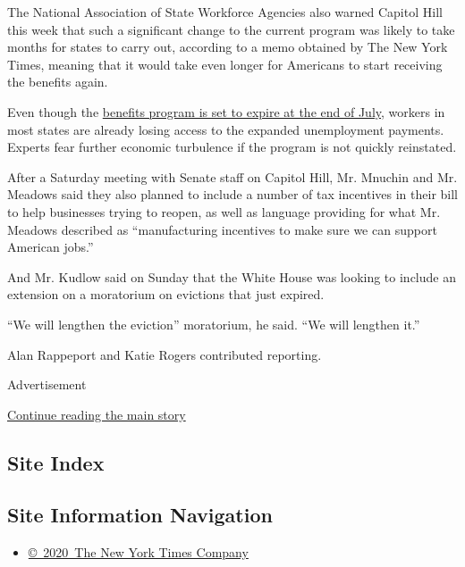 The National Association of State Workforce Agencies also warned Capitol
Hill this week that such a significant change to the current program was
likely to take months for states to carry out, according to a memo
obtained by The New York Times, meaning that it would take even longer
for Americans to start receiving the benefits again.

Even though the
\href{https://www.nytimes.com/2020/07/21/business/economy/coronavirus-unemployment-benefits.html}{benefits
program is set to expire at the end of July}, workers in most states are
already losing access to the expanded unemployment payments. Experts
fear further economic turbulence if the program is not quickly
reinstated.

After a Saturday meeting with Senate staff on Capitol Hill, Mr. Mnuchin
and Mr. Meadows said they also planned to include a number of tax
incentives in their bill to help businesses trying to reopen, as well as
language providing for what Mr. Meadows described as ``manufacturing
incentives to make sure we can support American jobs.''

And Mr. Kudlow said on Sunday that the White House was looking to
include an extension on a moratorium on evictions that just expired.

``We will lengthen the eviction'' moratorium, he said. ``We will
lengthen it.''

Alan Rappeport and Katie Rogers contributed reporting.

Advertisement

\protect\hyperlink{after-bottom}{Continue reading the main story}

\hypertarget{site-index}{%
\subsection{Site Index}\label{site-index}}

\hypertarget{site-information-navigation}{%
\subsection{Site Information
Navigation}\label{site-information-navigation}}

\begin{itemize}
\tightlist
\item
  \href{https://help.nytimes.com/hc/en-us/articles/115014792127-Copyright-notice}{©~2020~The
  New York Times Company}
\end{itemize}

